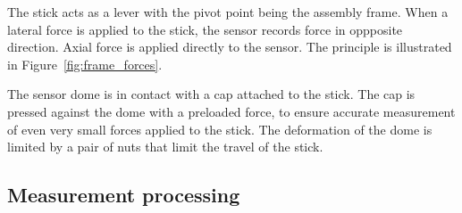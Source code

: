 \documentclass[buriama8_dp.tex]{subfiles}
\begin{document}
\begin{figure}[ht]
  \centering
  \caption{}
  \label{fig:label} 
\end{figure}

The stick acts as a lever with the pivot point being the assembly frame. When a lateral force is applied to the stick, the sensor records force in oppposite direction. Axial force is applied directly to the sensor. The principle is illustrated in Figure~\ref{fig:frame_forces}.

The sensor dome is in contact with a cap attached to the stick. The cap is pressed against the dome with a preloaded force, to ensure accurate measurement of even very small forces applied to the stick. The deformation of the dome is limited by a pair of nuts that limit the travel of the stick.




\subsection{Measurement processing}
\label{subsec:opto_process}
\end{document}

